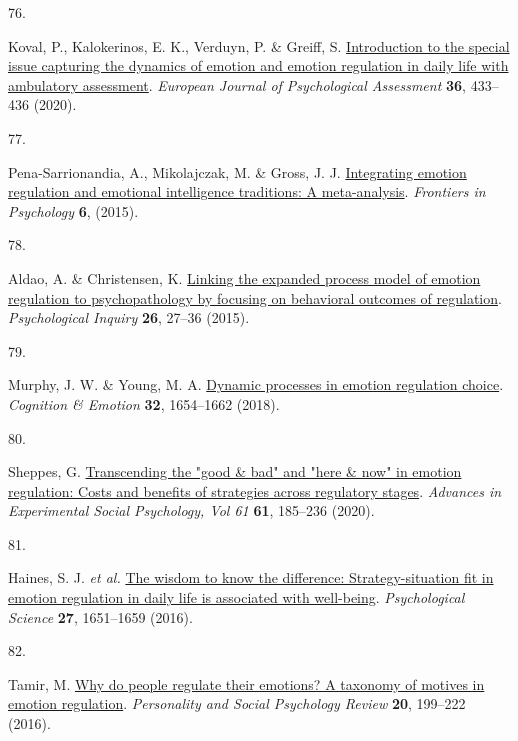 \documentclass[
  man,floatsintext]{apa6}
\newlength{\cslhangindent}
\newlength{\csllabelwidth}
\newlength{\cslentryspacingunit} %
\newenvironment{CSLReferences}[2] %
 {%
  \setlength{\parindent}{0pt}
  \ifodd #1
  \let\oldpar\par
  \def\par{\hangindent=\cslhangindent\oldpar}
  \fi
  \setlength{\parskip}{#2\cslentryspacingunit}
 }%
 {}
\newcommand{\CSLLeftMargin}[1]{\parbox[t]{\csllabelwidth}{#1}}
\newcommand{\CSLRightInline}[1]{\parbox[t]{\linewidth - \csllabelwidth}{#1}\break}
\begin{document}
\begin{CSLReferences}{0}{0}
\leavevmode{}%
\CSLLeftMargin{76. }%
\CSLRightInline{Koval, P., Kalokerinos, E. K., Verduyn, P. \& Greiff, S. \href{https://doi.org/10.1027/1015-5759/a000599}{Introduction to the special issue capturing the dynamics of emotion and emotion regulation in daily life with ambulatory assessment}. \emph{European Journal of Psychological Assessment} \textbf{36}, 433--436 (2020).}

\leavevmode{}%
\CSLLeftMargin{77. }%
\CSLRightInline{Pena-Sarrionandia, A., Mikolajczak, M. \& Gross, J. J. \href{https://doi.org/ARTN\%20160\%0A10.3389/fpsyg.2015.00160}{Integrating emotion regulation and emotional intelligence traditions: A meta-analysis}. \emph{Frontiers in Psychology} \textbf{6}, (2015).}

\leavevmode{}%
\CSLLeftMargin{78. }%
\CSLRightInline{Aldao, A. \& Christensen, K. \href{https://doi.org/10.1080/1047840x.2015.962399}{Linking the expanded process model of emotion regulation to psychopathology by focusing on behavioral outcomes of regulation}. \emph{Psychological Inquiry} \textbf{26}, 27--36 (2015).}

\leavevmode{}%
\CSLLeftMargin{79. }%
\CSLRightInline{Murphy, J. W. \& Young, M. A. \href{https://doi.org/10.1080/02699931.2017.1419935}{Dynamic processes in emotion regulation choice}. \emph{Cognition \& Emotion} \textbf{32}, 1654--1662 (2018).}

\leavevmode{}%
\CSLLeftMargin{80. }%
\CSLRightInline{Sheppes, G. \href{https://doi.org/10.1016/bs.aesp.2019.09.003}{Transcending the "good \& bad" and "here \& now" in emotion regulation: Costs and benefits of strategies across regulatory stages}. \emph{Advances in Experimental Social Psychology, Vol 61} \textbf{61}, 185--236 (2020).}

\leavevmode{}%
\CSLLeftMargin{81. }%
\CSLRightInline{Haines, S. J. \emph{et al.} \href{https://doi.org/10.1177/0956797616669086}{The wisdom to know the difference: Strategy-situation fit in emotion regulation in daily life is associated with well-being}. \emph{Psychological Science} \textbf{27}, 1651--1659 (2016).}

\leavevmode{}%
\CSLLeftMargin{82. }%
\CSLRightInline{Tamir, M. \href{https://doi.org/10.1177/1088868315586325}{Why do people regulate their emotions? A taxonomy of motives in emotion regulation}. \emph{Personality and Social Psychology Review} \textbf{20}, 199--222 (2016).}


\end{CSLReferences}
\end{document}
